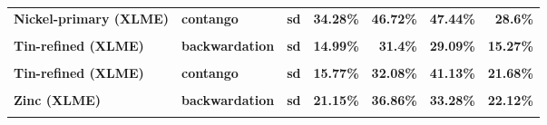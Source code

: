 \documentclass[
  authoryear,
  preprint,
  3p]{elsarticle}
\begin{document}
\begin{longtable}[t]{>{}l>{}l>{}l>{}r>{}r>{}r>{}r}
\textbf{Nickel-primary (XLME)} & \textbf{contango} & \textbf{sd} & \textcolor[HTML]{4285f4}{\textbf{34.28\%}} & \textcolor[HTML]{4285f4}{\textbf{46.72\%}} & \textcolor[HTML]{4285f4}{\textbf{47.44\%}} & \textcolor[HTML]{4285f4}{\textbf{28.6\%}}\\
\textbf{\cellcolor{gray!10}{Tin-refined (XLME)}} & \textbf{\cellcolor{gray!10}{backwardation}} & \textbf{\cellcolor{gray!10}{mean}} & \textcolor[HTML]{4285f4}{\textbf{\cellcolor{gray!10}{*15.83\%}}} & \textcolor[HTML]{4285f4}{\textbf{\cellcolor{gray!10}{34.62\%}}} & \textcolor[HTML]{4285f4}{\textbf{\cellcolor{gray!10}{23.7\%}}} & \textcolor[HTML]{4285f4}{\textbf{\cellcolor{gray!10}{4.48\%}}}\\
\textbf{Tin-refined (XLME)} & \textbf{backwardation} & \textbf{sd} & \textcolor[HTML]{4285f4}{\textbf{14.99\%}} & \textcolor[HTML]{4285f4}{\textbf{31.4\%}} & \textcolor[HTML]{4285f4}{\textbf{29.09\%}} & \textcolor[HTML]{4285f4}{\textbf{15.27\%}}\\
\textbf{\cellcolor{gray!10}{Tin-refined (XLME)}} & \textbf{\cellcolor{gray!10}{contango}} & \textbf{\cellcolor{gray!10}{mean}} & \textcolor[HTML]{4285f4}{\textbf{\cellcolor{gray!10}{-7.78\%}}} & \textcolor[HTML]{4285f4}{\textbf{\cellcolor{gray!10}{23.88\%}}} & \textcolor[HTML]{4285f4}{\textbf{\cellcolor{gray!10}{-6.82\%}}} & \textcolor[HTML]{4285f4}{\textbf{\cellcolor{gray!10}{-1.69\%}}}\\
\addlinespace
\textbf{Tin-refined (XLME)} & \textbf{contango} & \textbf{sd} & \textcolor[HTML]{4285f4}{\textbf{15.77\%}} & \textcolor[HTML]{4285f4}{\textbf{32.08\%}} & \textcolor[HTML]{4285f4}{\textbf{41.13\%}} & \textcolor[HTML]{4285f4}{\textbf{21.68\%}}\\
\textbf{\cellcolor{gray!10}{Zinc (XLME)}} & \textbf{\cellcolor{gray!10}{backwardation}} & \textbf{\cellcolor{gray!10}{mean}} & \textcolor[HTML]{4285f4}{\textbf{\cellcolor{gray!10}{-9.06\%}}} & \textcolor[HTML]{4285f4}{\textbf{\cellcolor{gray!10}{2.95\%}}} & \textcolor[HTML]{4285f4}{\textbf{\cellcolor{gray!10}{10.05\%}}} & \textcolor[HTML]{4285f4}{\textbf{\cellcolor{gray!10}{**29.42\%}}}\\
\textbf{Zinc (XLME)} & \textbf{backwardation} & \textbf{sd} & \textcolor[HTML]{4285f4}{\textbf{21.15\%}} & \textcolor[HTML]{4285f4}{\textbf{36.86\%}} & \textcolor[HTML]{4285f4}{\textbf{33.28\%}} & \textcolor[HTML]{4285f4}{\textbf{22.12\%}}\\
\textbf{\cellcolor{gray!10}{Zinc (XLME)}} & \textbf{\cellcolor{gray!10}{contango}} & \textbf{\cellcolor{gray!10}{mean}} & \textcolor[HTML]{4285f4}{\textbf{\cellcolor{gray!10}{-0.13\%}}} & \textcolor[HTML]{4285f4}{\textbf{\cellcolor{gray!10}{37.11\%}}} & \textcolor[HTML]{4285f4}{\textbf{\cellcolor{gray!10}{5.43\%}}} & \textcolor[HTML]{4285f4}{\textbf{\cellcolor{gray!10}{-11.31\%}}}\\

\end{longtable}
\end{document}
